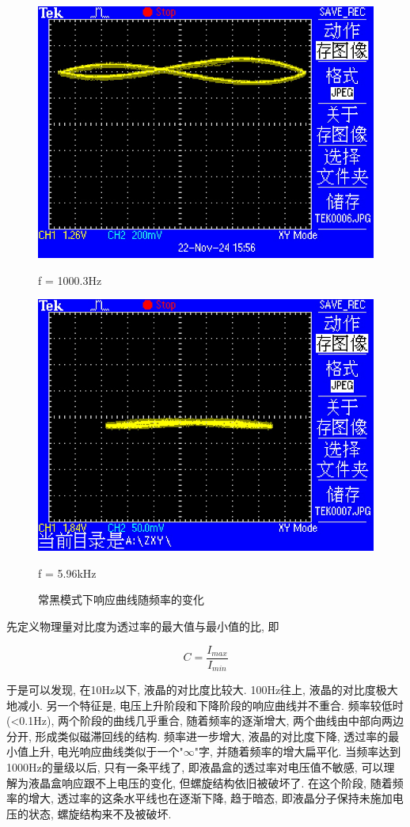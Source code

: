 \documentclass[12pt,a4paper]{article}
\newcommand{\be}[1]{
    \begin{equation}
        #1
    \end{equation}
}
\begin{document}
\begin{figure}[htbp]
\begin{minipage}[b]{0.22\textwidth}
    \includegraphics[width=\textwidth]{XY/TEK0006.JPG}
    \caption{f = 1000.3Hz}
\end{minipage}
\hfill
\begin{minipage}[b]{0.22\textwidth}
    \centering
    \includegraphics[width=\textwidth]{XY/TEK0007.JPG}
    \caption{f = 5.96kHz}
\end{minipage}
\caption{常黑模式下响应曲线随频率的变化}
\end{figure}
先定义物理量对比度为透过率的最大值与最小值的比, 即
\be{C=\frac{I_{max}}{I_{min}}}
于是可以发现, 在10Hz以下, 液晶的对比度比较大. 100Hz往上, 液晶的对比度极大地减小. 另一个特征是, 电压上升阶段和下降阶段的响应曲线并不重合. 频率较低时(<0.1Hz), 两个阶段的曲线几乎重合, 随着频率的逐渐增大, 两个曲线由中部向两边分开, 形成类似磁滞回线的结构. 
频率进一步增大, 液晶的对比度下降, 透过率的最小值上升, 电光响应曲线类似于一个"$\infty$"字, 并随着频率的增大扁平化. 当频率达到1000Hz的量级以后, 只有一条平线了, 即液晶盒的透过率对电压值不敏感, 可以理解为液晶盒响应跟不上电压的变化, 但螺旋结构依旧被破坏了. 在这个阶段, 随着频率的增大, 透过率的这条水平线也在逐渐下降, 趋于暗态, 即液晶分子保持未施加电压的状态, 螺旋结构来不及被破坏. 
\end{document}
